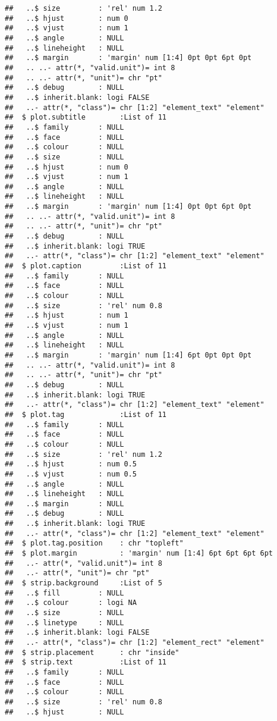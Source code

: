 \documentclass[]{article}
\begin{document}
\begin{verbatim}
##   ..$ size         : 'rel' num 1.2
##   ..$ hjust        : num 0
##   ..$ vjust        : num 1
##   ..$ angle        : NULL
##   ..$ lineheight   : NULL
##   ..$ margin       : 'margin' num [1:4] 0pt 0pt 6pt 0pt
##   .. ..- attr(*, "valid.unit")= int 8
##   .. ..- attr(*, "unit")= chr "pt"
##   ..$ debug        : NULL
##   ..$ inherit.blank: logi FALSE
##   ..- attr(*, "class")= chr [1:2] "element_text" "element"
##  $ plot.subtitle        :List of 11
##   ..$ family       : NULL
##   ..$ face         : NULL
##   ..$ colour       : NULL
##   ..$ size         : NULL
##   ..$ hjust        : num 0
##   ..$ vjust        : num 1
##   ..$ angle        : NULL
##   ..$ lineheight   : NULL
##   ..$ margin       : 'margin' num [1:4] 0pt 0pt 6pt 0pt
##   .. ..- attr(*, "valid.unit")= int 8
##   .. ..- attr(*, "unit")= chr "pt"
##   ..$ debug        : NULL
##   ..$ inherit.blank: logi TRUE
##   ..- attr(*, "class")= chr [1:2] "element_text" "element"
##  $ plot.caption         :List of 11
##   ..$ family       : NULL
##   ..$ face         : NULL
##   ..$ colour       : NULL
##   ..$ size         : 'rel' num 0.8
##   ..$ hjust        : num 1
##   ..$ vjust        : num 1
##   ..$ angle        : NULL
##   ..$ lineheight   : NULL
##   ..$ margin       : 'margin' num [1:4] 6pt 0pt 0pt 0pt
##   .. ..- attr(*, "valid.unit")= int 8
##   .. ..- attr(*, "unit")= chr "pt"
##   ..$ debug        : NULL
##   ..$ inherit.blank: logi TRUE
##   ..- attr(*, "class")= chr [1:2] "element_text" "element"
##  $ plot.tag             :List of 11
##   ..$ family       : NULL
##   ..$ face         : NULL
##   ..$ colour       : NULL
##   ..$ size         : 'rel' num 1.2
##   ..$ hjust        : num 0.5
##   ..$ vjust        : num 0.5
##   ..$ angle        : NULL
##   ..$ lineheight   : NULL
##   ..$ margin       : NULL
##   ..$ debug        : NULL
##   ..$ inherit.blank: logi TRUE
##   ..- attr(*, "class")= chr [1:2] "element_text" "element"
##  $ plot.tag.position    : chr "topleft"
##  $ plot.margin          : 'margin' num [1:4] 6pt 6pt 6pt 6pt
##   ..- attr(*, "valid.unit")= int 8
##   ..- attr(*, "unit")= chr "pt"
##  $ strip.background     :List of 5
##   ..$ fill         : NULL
##   ..$ colour       : logi NA
##   ..$ size         : NULL
##   ..$ linetype     : NULL
##   ..$ inherit.blank: logi FALSE
##   ..- attr(*, "class")= chr [1:2] "element_rect" "element"
##  $ strip.placement      : chr "inside"
##  $ strip.text           :List of 11
##   ..$ family       : NULL
##   ..$ face         : NULL
##   ..$ colour       : NULL
##   ..$ size         : 'rel' num 0.8
##   ..$ hjust        : NULL

\end{verbatim}
\end{document}
